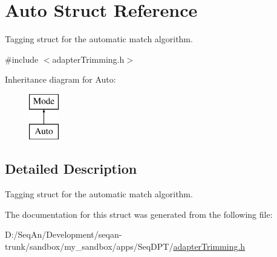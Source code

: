 \hypertarget{struct_auto}{\section{Auto Struct Reference}
\label{struct_auto}
}


Tagging struct for the automatic match algorithm.  




{\ttfamily \#include $<$adapter\-Trimming.\-h$>$}

Inheritance diagram for Auto\-:\begin{figure}[H]
\begin{center}
\leavevmode
\includegraphics[height=2.000000cm]{struct_auto}
\end{center}
\end{figure}


\subsection{Detailed Description}
Tagging struct for the automatic match algorithm. 

The documentation for this struct was generated from the following file\-:\begin{DoxyCompactItemize}
\item 
D\-:/\-Seq\-An/\-Development/seqan-\/trunk/sandbox/my\-\_\-sandbox/apps/\-Seq\-D\-P\-T/\hyperlink{adapter_trimming_8h}{adapter\-Trimming.\-h}\end{DoxyCompactItemize}
